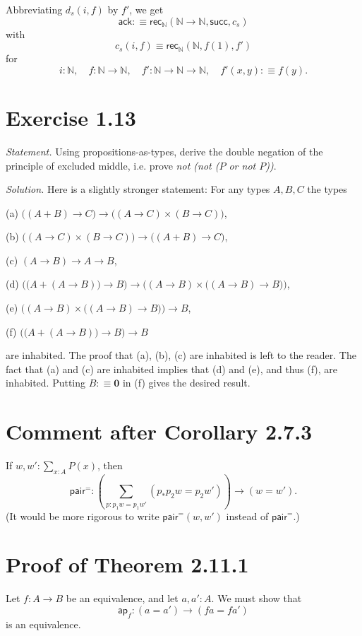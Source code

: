 \documentclass[12pt]{article}
\newcommand{\mbf}{\mathbf}
\newcommand{\msf}{\mathsf}
\newcommand{\ack}{\mathsf{ack}}
\newcommand{\ap}{\mathsf{ap}}
\newcommand{\N}{\mathbb N}
\newcommand{\nn}{\noindent}
\newcommand{\rec}{\mathsf{rec}}
\newcommand{\su}{\mathsf{succ}}
\begin{document}
Abbreviating $d_s(i,f)$ by $f'$, we get 
$$
\ack:\equiv\rec_\N(\N\to\N,\su,c_s)
$$ 
with 
$$ 
c_s(i,f)\equiv\rec_\N(\N,f(1),f')
$$ 
for 
$$ 
i:\N,\quad f:\N\to\N,\quad f':\N\to\N\to\N,\quad f'(x,y):\equiv f(y).
$$


\section{Exercise 1.13}

\emph{Statement.} Using propositions-as-types, derive the double negation of the principle of excluded middle, i.e. prove \emph{not (not ($P$ or not $P$))}.

\nn\emph{Solution.} Here is a slightly stronger statement: For any types $A,B,C$ the types

(a) $\big((A+B)\to C\big)\to\big((A\to C)\times(B\to C)\big)$,

(b) $\big((A\to C)\times(B\to C)\big)\to\big((A+B)\to C\big)$,

(c) $(A\to B)\to A\to B$,

(d) $\Big(\big(A+(A\to B)\big)\to B\Big)\to\Big((A\to B)\times\big((A\to B)\to B\big)\Big)$, 

(e) $\Big((A\to B)\times\big((A\to B)\to B\big)\Big)\to B$,

(f) $\Big(\big(A+(A\to B)\big)\to B\Big)\to B$

\nn are inhabited. The proof that (a), (b), (c) are inhabited is left to the reader. The fact that (a) and (c) are inhabited implies that (d) and (e), and thus (f), are inhabited. Putting $B:\equiv\mbf0$ in (f) gives the desired result.


\section{Comment after Corollary 2.7.3}

If $w,w':\sum_{x:A}P(x)$, then 
$$
\msf{pair}^=:\left(\sum_{p:p_1w=p_1w'}(p_*p_2w=p_2w')\right)\to(w=w').
$$ 
(It would be more rigorous to write $\msf{pair}^=(w,w')$ instead of $\msf{pair}^=$.)


\section{Proof of Theorem 2.11.1}

Let $f:A\to B$ be an equivalence, and let $a,a':A$. We must show that 
$$
\ap_f:(a=a')\to (fa=fa')
$$ 
is an equivalence.
\end{document}
